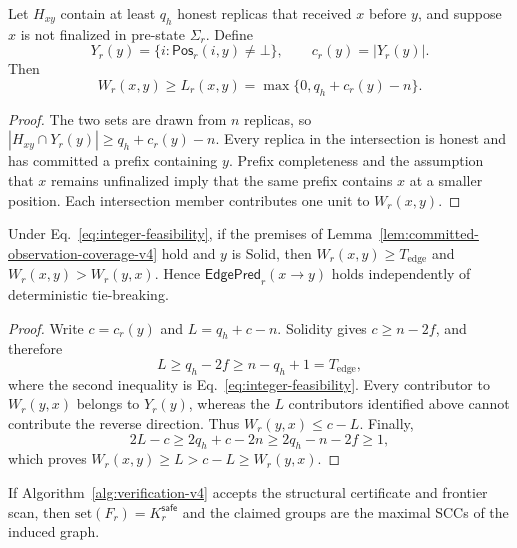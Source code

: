 \begin{lemma}
\label{lem:committed-observation-coverage-v4}
Let $H_{xy}$ contain at least $q_h$ honest replicas that received $x$ before
$y$, and suppose $x$ is not finalized in pre-state $\Sigma_r$.  Define
\[
 Y_r(y)=\{i:\mathsf{Pos}_r(i,y)\ne\bot\},
 \qquad c_r(y)=|Y_r(y)|.
\]
Then
\[
 W_r(x,y)\ge L_r(x,y)
   =\max\{0,q_h+c_r(y)-n\}.
 \tag{15}\label{eq:coverage-lower-bound-v4}
\]
\end{lemma}

\begin{proof}
The two sets are drawn from $n$ replicas, so
$|H_{xy}\cap Y_r(y)|\ge q_h+c_r(y)-n$.  Every replica in the intersection is
honest and has committed a prefix containing $y$.  Prefix completeness and
the assumption that $x$ remains unfinalized imply that the same prefix contains
$x$ at a smaller position.  Each intersection member contributes one unit to
$W_r(x,y)$.
\end{proof}

\begin{lemma}
\label{lem:fair-edge-formation-v4}
Under Eq.~\eqref{eq:integer-feasibility}, if the premises of
Lemma~\ref{lem:committed-observation-coverage-v4} hold and $y$ is Solid, then
$W_r(x,y)\ge T_{\mathrm{edge}}$ and
$W_r(x,y)>W_r(y,x)$.  Hence $\mathsf{EdgePred}_r(x\to y)$ holds independently
of deterministic tie-breaking.
\end{lemma}

\begin{proof}
Write $c=c_r(y)$ and $L=q_h+c-n$.  Solidity gives $c\ge n-2f$, and therefore
\[
 L\ge q_h-2f\ge n-q_h+1=T_{\mathrm{edge}},
\]
where the second inequality is Eq.~\eqref{eq:integer-feasibility}.  Every
contributor to $W_r(y,x)$ belongs to $Y_r(y)$, whereas the $L$ contributors
identified above cannot contribute the reverse direction.  Thus
$W_r(y,x)\le c-L$.  Finally,
\[
 2L-c\ge2q_h+c-2n\ge2q_h-n-2f\ge1,
\]
which proves $W_r(x,y)\ge L>c-L\ge W_r(y,x)$.
\end{proof}

\begin{lemma}
\label{lem:safe-closure-certificate-v4}
If Algorithm~\ref{alg:verification-v4} accepts the structural certificate and
frontier scan, then $\mathrm{set}(F_r)=K_r^{\mathsf{safe}}$ and the claimed
groups are the maximal SCCs of the induced graph.
\end{lemma}

